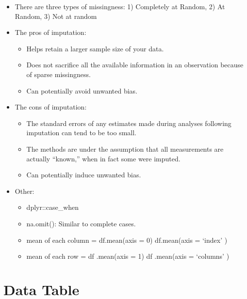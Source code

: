 \documentclass[]{book}
\theoremstyle{definition}
\theoremstyle{definition}
\theoremstyle{definition}
\theoremstyle{remark}
\begin{document}
\begin{itemize}
\item
  There are three types of missingness: 1) Completely at Random, 2) At
  Random, 3) Not at random
\item
  The pros of imputation:

  \begin{itemize}
  \item
    Helps retain a larger sample size of your data.
  \item
    Does not sacrifice all the available information in an observation
    because of sparse missingness.
  \item
    Can potentially avoid unwanted bias.
  \end{itemize}
\item
  The cons of imputation:

  \begin{itemize}
  \item
    The standard errors of any estimates made during analyses following
    imputation can tend to be too small.
  \item
    The methods are under the assumption that all measurements are
    actually ``known,'' when in fact some were imputed.
  \item
    Can potentially induce unwanted bias.
  \end{itemize}
\item
  Other:

  \begin{itemize}
  \item
    dplyr::case\_when
  \item
    na.omit(): Similar to complete cases.
  \item
    mean of each column = df.mean(axis = 0) \textbar{}\textbar{}
    df.mean(axis = `index' )
  \item
    mean of each row = df .mean(axis = 1) \textbar{}\textbar{} df
    .mean(axis = `columns' )
  \end{itemize}
\end{itemize}

\section{Data Table}\label{data-table}
\end{document}
